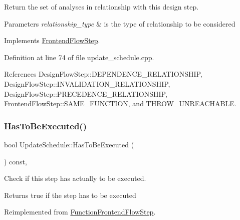 Return the set of analyses in relationship with this design step. 


\begin{DoxyParams}{Parameters}
{\em relationship\+\_\+type} & is the type of relationship to be considered \\
\hline
\end{DoxyParams}


Implements \hyperlink{classFrontendFlowStep_abeaff70b59734e462d347ed343dd700d}{Frontend\+Flow\+Step}.



Definition at line 74 of file update\+\_\+schedule.\+cpp.



References Design\+Flow\+Step\+::\+D\+E\+P\+E\+N\+D\+E\+N\+C\+E\+\_\+\+R\+E\+L\+A\+T\+I\+O\+N\+S\+H\+IP, Design\+Flow\+Step\+::\+I\+N\+V\+A\+L\+I\+D\+A\+T\+I\+O\+N\+\_\+\+R\+E\+L\+A\+T\+I\+O\+N\+S\+H\+IP, Design\+Flow\+Step\+::\+P\+R\+E\+C\+E\+D\+E\+N\+C\+E\+\_\+\+R\+E\+L\+A\+T\+I\+O\+N\+S\+H\+IP, Frontend\+Flow\+Step\+::\+S\+A\+M\+E\+\_\+\+F\+U\+N\+C\+T\+I\+ON, and T\+H\+R\+O\+W\+\_\+\+U\+N\+R\+E\+A\+C\+H\+A\+B\+LE.

\mbox{\label{classUpdateSchedule_a8b63b0bd4821e2759cffe3a86910e430}} 
\subsubsection{\texorpdfstring{Has\+To\+Be\+Executed()}{HasToBeExecuted()}}
{\footnotesize\ttfamily bool Update\+Schedule\+::\+Has\+To\+Be\+Executed (\begin{DoxyParamCaption}{ }\end{DoxyParamCaption}) const\hspace{0.3cm}{\ttfamily [override]}, {\ttfamily [virtual]}}



Check if this step has actually to be executed. 

\begin{DoxyReturn}{Returns}
true if the step has to be executed 
\end{DoxyReturn}


Reimplemented from \hyperlink{classFunctionFrontendFlowStep_a12e786363530aa9533e4bd9380130d75}{Function\+Frontend\+Flow\+Step}.



